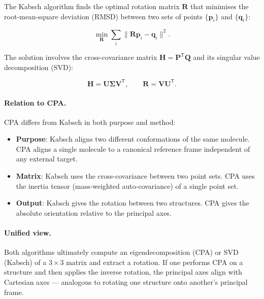 \documentclass[11pt,a4paper]{article}
\newcommand{\vect}[1]{\bm{#1}}
\begin{document}
The Kabsch algorithm finds the optimal rotation matrix $\vect{R}$ that
minimises the root-mean-square deviation (RMSD) between two sets of
points $\{\vect{p}_i\}$ and $\{\vect{q}_i\}$:

\begin{equation}
\min_{\vect{R}} \sum_i \|\vect{R} \vect{p}_i - \vect{q}_i\|^2.
\end{equation}

The solution involves the cross-covariance matrix
$\vect{H} = \vect{P}^{\mathsf T} \vect{Q}$ and its singular value
decomposition (SVD):

\begin{equation}
\vect{H} = \vect{U} \vect{\Sigma} \vect{V}^{\mathsf T},
\qquad
\vect{R} = \vect{V} \vect{U}^{\mathsf T}.
\end{equation}

\paragraph{Relation to CPA.}  CPA differs from Kabsch in both purpose
and method:

\begin{itemize}
    \item \textbf{Purpose}: Kabsch aligns two different conformations of
          the same molecule.  CPA aligns a single molecule to a canonical
          reference frame independent of any external target.
    \item \textbf{Matrix}: Kabsch uses the cross-covariance between two
          point sets.  CPA uses the inertia tensor (mass-weighted
          auto-covariance) of a single point set.
    \item \textbf{Output}: Kabsch gives the rotation between two
          structures.  CPA gives the absolute orientation relative to the
          principal axes.
\end{itemize}

\paragraph{Unified view.}  Both algorithms ultimately compute an
eigendecomposition (CPA) or SVD (Kabsch) of a $3 \times 3$ matrix and
extract a rotation.  If one performs CPA on a structure and then applies
the inverse rotation, the principal axes align with Cartesian axes ---
analogous to rotating one structure onto another's principal frame.

\end{document}
